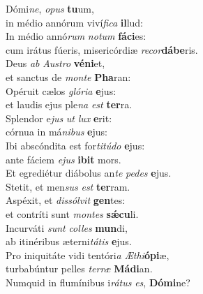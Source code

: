 \evenverse Dómi\textit{ne}, \textit{o}\textit{pus} \textbf{tu}um,~\*\\
\evenverse in médio annórum viví\textit{fi}\textit{ca} \textbf{il}lud:\\
\oddverse In médio annó\textit{rum} \textit{no}\textit{tum} \textbf{fá}\textbf{ci}es:~\*\\
\oddverse cum irátus fúeris, misericórdiæ \textit{re}\textit{cor}\textbf{dá}\textbf{be}ris.\\
\evenverse Deus \textit{ab} \textit{Au}\textit{stro} \textbf{vé}\textbf{ni}et,~\*\\
\evenverse et sanctus de \textit{mon}\textit{te} \textbf{Pha}ran:\\
\oddverse Opéruit cælos \textit{gló}\textit{ri}\textit{a} \textbf{e}jus:~\*\\
\oddverse et laudis ejus ple\textit{na} \textit{est} \textbf{ter}ra.\\
\evenverse Splendor e\textit{jus} \textit{ut} \textit{lux} \textbf{e}rit:~\*\\
\evenverse córnua in má\textit{ni}\textit{bus} \textbf{e}jus:\\
\oddverse Ibi abscóndita est for\textit{ti}\textit{tú}\textit{do} \textbf{e}jus:~\*\\
\oddverse ante fáciem \textit{e}\textit{jus} \textbf{i}\textbf{bit} mors.\\
\evenverse Et egrediétur diábolus an\textit{te} \textit{pe}\textit{des} \textbf{e}jus.~\*\\
\evenverse Stetit, et men\textit{sus} \textit{est} \textbf{ter}ram.\\
\oddverse Aspéxit, et \textit{dis}\textit{sól}\textit{vit} \textbf{gen}tes:~\*\\
\oddverse et contríti sunt \textit{mon}\textit{tes} \textbf{sǽ}\textbf{cu}li.\\
\evenverse Incurváti \textit{sunt} \textit{col}\textit{les} \textbf{mun}di,~\*\\
\evenverse ab itinéribus æterni\textit{tá}\textit{tis} \textbf{e}jus.\\
\oddverse Pro iniquitáte vidi tentóri\textit{a} \textit{Æ}\textit{thi}\textbf{ó}\textbf{pi}æ,~\*\\
\oddverse turbabúntur pelles \textit{ter}\textit{ræ} \textbf{Má}\textbf{di}an.\\
\evenverse Numquid in flumínibus i\textit{rá}\textit{tus} \textit{es}, \textbf{Dó}\textbf{mi}ne?~\*\\
